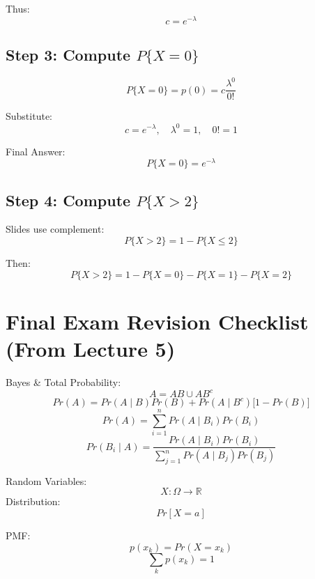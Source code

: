 \documentclass{article}
\begin{document}
Thus:
\[
c=e^{-\lambda}
\]

\subsection{Step 3: Compute $P\{X=0\}$}
\[
P\{X=0\}=p(0)=c\frac{\lambda^0}{0!}
\]

Substitute:
\[
c=e^{-\lambda},\quad \lambda^0=1,\quad 0!=1
\]

Final Answer:
\[
P\{X=0\}=e^{-\lambda}
\]

\subsection{Step 4: Compute $P\{X>2\}$}

Slides use complement:
\[
P\{X>2\}=1-P\{X\le 2\}
\]

Then:
\[
P\{X>2\}=1-P\{X=0\}-P\{X=1\}-P\{X=2\}
\]

\section*{Final Exam Revision Checklist (From Lecture 5)}

Bayes \& Total Probability:
\[
A=AB\cup AB^c
\]
\[
Pr(A)=Pr(A\mid B)Pr(B)+Pr(A\mid B^c)\big[1-Pr(B)\big]
\]
\[
Pr(A)=\sum_{i=1}^{n}Pr(A\mid B_i)Pr(B_i)
\]
\[
Pr(B_i\mid A)=
\frac{Pr(A\mid B_i)Pr(B_i)}
{\sum_{j=1}^{n}Pr(A\mid B_j)Pr(B_j)}
\]

Random Variables:
\[
X:\Omega\to \mathbb{R}
\]
Distribution:
\[
Pr[X=a]
\]

PMF:
\[
p(x_k)=Pr(X=x_k)
\]
\[
\sum_k p(x_k)=1
\]
\end{document}
